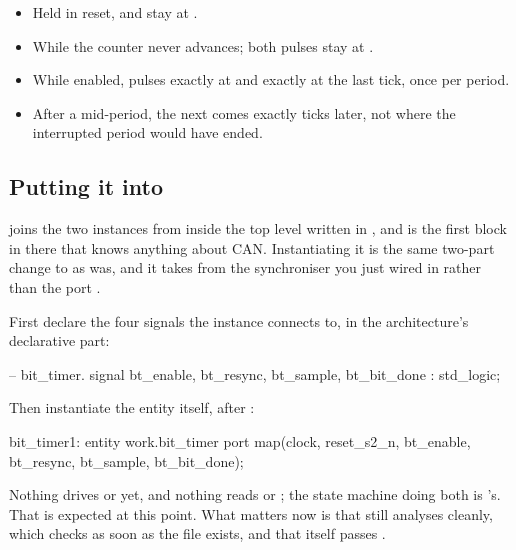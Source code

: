 \begin{itemize}
  \item Held in reset,  and  stay at .
  \item While  the counter never advances; both pulses stay at .
  \item While enabled,  pulses exactly at  and  exactly
    at the last tick, once per period.
  \item After a  mid-period, the next  comes exactly
     ticks later, not where the interrupted period would have ended.
\end{itemize}

\subsection{Putting it into }
\label{c12:sub:btwire}

 joins the two  instances from  inside the
top level written in , and is the first block in there that knows anything about CAN.
Instantiating it is the same two-part change to  as
 was, and it takes  from the synchroniser you just wired in rather
than the port .

First declare the four signals the instance connects to, in the architecture's declarative part:

\begin{vhdlcode}
    -- bit_timer.
    signal bt_enable, bt_resync, bt_sample, bt_bit_done : std_logic;
\end{vhdlcode}

Then instantiate the entity itself, after :

\begin{vhdlcode}
    bit_timer1: entity work.bit_timer
        port map(clock, reset_s2_n, bt_enable, bt_resync, bt_sample, bt_bit_done);
\end{vhdlcode}

Nothing drives  or  yet, and nothing reads  or
; the state machine doing both is 's. That is expected at this
point. What matters now is that  still analyses cleanly, which  checks as soon as the file exists, and that  itself passes
.
